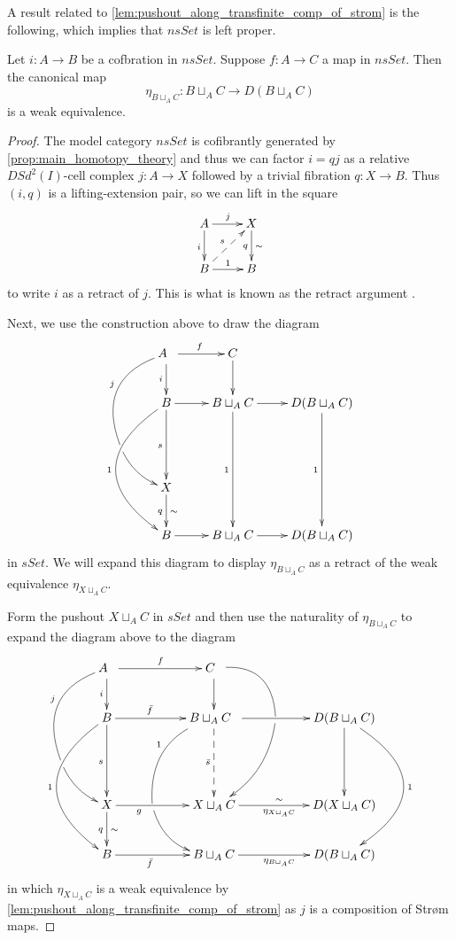 A result related to \cref{lem:pushout_along_transfinite_comp_of_strom} is the following, which implies that $nsSet$ is left proper.
\begin{lemma}\label{lem:pushout_along_cofibration}
Let $i:A\to B$ be a cofbration in $nsSet$. Suppose $f:A\to C$ a map in $nsSet$. Then the canonical map
\[\eta _{B\sqcup _AC}:B\sqcup _AC\to D(B\sqcup _AC)\]
is a weak equivalence.
\end{lemma}
\begin{proof}
The model category $nsSet$ is cofibrantly generated by \cref{prop:main_homotopy_theory} and thus we can factor $i=qj$ as a relative $DSd^2(I)$-cell complex $j:A\to X$ followed by a trivial fibration $q:X\to B$. Thus $(i,q)$ is a lifting-extension pair, so we can lift in the square
\begin{displaymath}
\xymatrix{
A \ar[d]_i \ar[r]^j & X \ar[d]^\sim _q \\
B \ar[r]^1 \ar@{-->}[ur]^s & B
}
\end{displaymath}
to write $i$ as a retract of $j$. This is what is known as the retract argument \cite[Prop.~7.2.2, p.~110]{Hi03}.

Next, we use the construction above to draw the diagram
\begin{displaymath}
\xymatrix{
& A \ar@{-}@/_1.9pc/[ldd]_j\hole \ar[d]_i \ar[r]^f & C \ar[d] \\
& B \ar@/_3.4pc/[ddd]_1 \ar[dd]_s \ar[r] & B\sqcup _AC \ar[ddd]_1 \ar[r] & D(B\sqcup _AC) \ar[ddd]_1 \\
\ar@/_/[dr] \\
& X \ar[d]_q^\sim \\
& B \ar[r] & B\sqcup _AC \ar[r] & D(B\sqcup _AC)
}
\end{displaymath}
in $sSet$. We will expand this diagram to display $\eta _{B\sqcup _AC}$
as a retract of the weak equivalence $\eta _{X\sqcup _AC}$.

Form the pushout $X\sqcup _AC$ in $sSet$ and then use the naturality of $\eta _{B\sqcup _AC}$ to expand the diagram above to the diagram
\begin{displaymath}
\xymatrix{
& A \ar@{-}@/_1.9pc/[ldd]_j\hole \ar[d]_i \ar[rr]^f && C \ar[d] \ar@{-}@/^1.5pc/[dr]\hole \\
& B \ar@/_3.4pc/[ddd]_1 \ar[dd]_s \ar[rr]^(.4){\bar{f} } && B\sqcup _AC\ar@{-->}[dd]_{\bar{s} } \ar@/_1.5pc/@{-}[ldd]_1\hole \ar[rr] & \ar@/^1pc/[ldd] & D(B\sqcup _AC) \ar[dd] \ar@/^4pc/[ddd]^1 \\
\ar@/_/[dr] \\
& X \ar[d]_q^\sim \ar[rr]_(.3)g & \ar@/_1pc/[dr] & X\sqcup _AC \ar[rr]^\sim _{\eta _{X\sqcup _AC}} && D(X\sqcup _AC) \\
& B \ar[rr]_(.4){\bar{f} } && B\sqcup _AC \ar[rr]_{\eta _{B\sqcup _AC}} && D(B\sqcup _AC)
}
\end{displaymath}
in which $\eta _{X\sqcup _AC}$ is a weak equivalence by \cref{lem:pushout_along_transfinite_comp_of_strom} as $j$ is a composition of Str\o m maps.


\end{proof}
